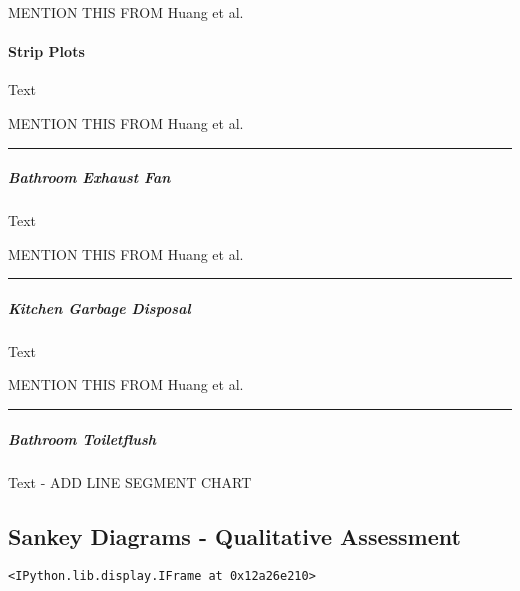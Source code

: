 \documentclass[reprint, floatfix, groupaddress, prb]{revtex4-1}
\newcommand{\prompt}[4]{
        \llap{{\color{#2}[#3]: #4}}\vspace{-1.25em}
    }
\begin{document}
    MENTION THIS FROM Huang et al.~ 

    \hypertarget{strip-plots}{%
\paragraph{Strip Plots}\label{strip-plots}}

    Text

    MENTION THIS FROM Huang et al.~

\begin{center}\rule{0.5\linewidth}{\linethickness}\end{center}

    \hypertarget{bathroom-exhaust-fan}{%
\subparagraph{Bathroom Exhaust Fan}\label{bathroom-exhaust-fan}}

    Text

    MENTION THIS FROM Huang et al.~

\begin{center}\rule{0.5\linewidth}{\linethickness}\end{center}

    \hypertarget{kitchen-garbage-disposal}{%
\subparagraph{Kitchen Garbage Disposal}\label{kitchen-garbage-disposal}}

    Text

    MENTION THIS FROM Huang et al.~

\begin{center}\rule{0.5\linewidth}{\linethickness}\end{center}

    \hypertarget{bathroom-toiletflush}{%
\subparagraph{Bathroom Toiletflush}\label{bathroom-toiletflush}}

    Text - ADD LINE SEGMENT CHART

    \hypertarget{sankey-diagrams---qualitative-assessment}{%
\subsection{Sankey Diagrams - Qualitative
Assessment}\label{sankey-diagrams---qualitative-assessment}}


            \begin{tcolorbox}[breakable, boxrule=.5pt, size=fbox, pad at break*=1mm, opacityfill=0]
\prompt{Out}{outcolor}{68}{\hspace{3.5pt}}
\begin{Verbatim}[commandchars=\\\{\}]
<IPython.lib.display.IFrame at 0x12a26e210>
\end{Verbatim}
\end{tcolorbox}
        
\end{document}
